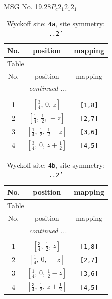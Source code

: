 \documentclass[fleqn,8pt]{jsarticle}
\begin{document}
\setcounter{MaxMatrixCols}{32}

\renewcommand{\tablename}{Table~}
\renewcommand{\figurename}{Figure~}
\begin{center}
\LARGE
MSG No. 19.28\quad$P_{c}2_{1}2_{1}2_{1}$
\end{center}
\renewcommand{\arraystretch}{1.2}
\begin{longtable}{ccc}
\caption{Wyckoff site: {\tt 4a}, site symmetry: {\tt ..2'}}
 \\
 \hline \hline
No. & position & mapping \\ \hline \endfirsthead

\multicolumn{2}{l}{\tablename\ \thetable{}} \\
 \hline \hline
No. & position & mapping \\ \hline \endhead

 \hline \hline
\multicolumn{2}{r}{\footnotesize\it continued ...} \\ \endfoot

 \hline \hline
\multicolumn{2}{r}{} \\ \endlastfoot

1 & $\left[ \frac{3}{4},\, 0,\, z \right]$ & {\tt [1,8]} \\ \hline
2 & $\left[ \frac{1}{4},\, \frac{1}{2},\, - z \right]$ & {\tt [2,7]} \\ \hline
3 & $\left[ \frac{1}{4},\, \frac{1}{2},\, \frac{1}{2} - z \right]$ & {\tt [3,6]} \\ \hline
4 & $\left[ \frac{3}{4},\, 0,\, z + \frac{1}{2} \right]$ & {\tt [4,5]} \\
\end{longtable}
\renewcommand{\arraystretch}{1.2}
\begin{longtable}{ccc}
\caption{Wyckoff site: {\tt 4b}, site symmetry: {\tt ..2'}}
 \\
 \hline \hline
No. & position & mapping \\ \hline \endfirsthead

\multicolumn{2}{l}{\tablename\ \thetable{}} \\
 \hline \hline
No. & position & mapping \\ \hline \endhead

 \hline \hline
\multicolumn{2}{r}{\footnotesize\it continued ...} \\ \endfoot

 \hline \hline
\multicolumn{2}{r}{} \\ \endlastfoot

1 & $\left[ \frac{3}{4},\, \frac{1}{2},\, z \right]$ & {\tt [1,8]} \\ \hline
2 & $\left[ \frac{1}{4},\, 0,\, - z \right]$ & {\tt [2,7]} \\ \hline
3 & $\left[ \frac{1}{4},\, 0,\, \frac{1}{2} - z \right]$ & {\tt [3,6]} \\ \hline
4 & $\left[ \frac{3}{4},\, \frac{1}{2},\, z + \frac{1}{2} \right]$ & {\tt [4,5]} \\
\end{longtable}
\end{document}
